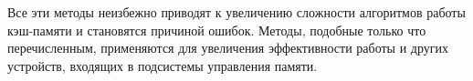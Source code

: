 Все эти методы неизбежно приводят к увеличению сложности алгоритмов работы кэш-памяти и становятся причиной ошибок. Методы, подобные только что перечисленным, применяются для увеличения эффективности работы и других устройств, входящих в подсистемы управления памяти.





%

